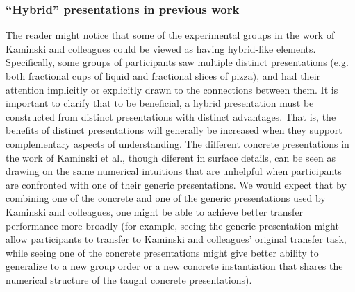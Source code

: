 \documentclass[man,10pt]{apa6}
\begin{document}
\subsubsection{``Hybrid'' presentations in previous work}
The reader might notice that some of the experimental groups in the work of Kaminski and colleagues could be viewed as having hybrid-like elements. Specifically, some groups of participants saw multiple distinct presentations (e.g. both fractional cups of liquid and fractional slices of pizza), and had their attention implicitly or explicitly drawn to the connections between them. It is important to clarify that to be beneficial, a hybrid presentation must be constructed from distinct presentations with distinct advantages. That is, the benefits of distinct presentations will generally be increased when they support complementary aspects of understanding. The different concrete presentations in the work of Kaminski et al., though diferent in surface details, can be seen as drawing on the same numerical intuitions that are unhelpful when participants are confronted with one of their generic presentations. We would expect that by combining one of the concrete and one of the generic presentations used by Kaminski and colleagues, one might be able to achieve better transfer performance more broadly (for example, seeing the generic presentation might allow participants to transfer to Kaminski and colleagues' original transfer task, while seeing one of the concrete presentations might give better ability to generalize to a new group order or a new concrete instantiation that shares the numerical structure of the taught concrete presentations).  
\end{document}
